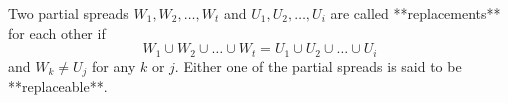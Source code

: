 Two partial spreads $W_1, W_2, \dots, W_t$ and $U_1, U_2, \dots, U_i$ are called **replacements** for each other if
$$W_1 \cup W_2 \cup \dots \cup W_t = U_1 \cup U_2 \cup \dots \cup U_i$$
and $W_k \neq U_j$ for any $k$ or $j$. Either one of the partial spreads is said to be **replaceable**.
